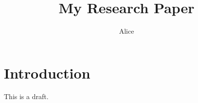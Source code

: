 \documentclass{article}
\title{My Research Paper}
\author{Alice}
\begin{document}
\maketitle
\section{Introduction}
This is a draft.
\end{document}
